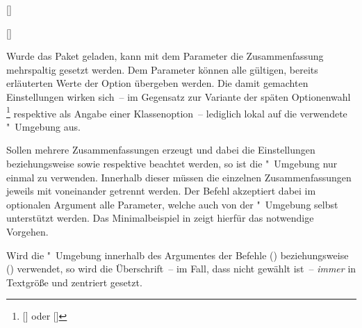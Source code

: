 \begin{Declaration*}{}
\begin{Declaration*}{}
\begin{Declaration*}{}
\begin{Declaration}{[]}
\begin{Declaration}{[]}
\begin{Declaration}{}
\begin{Declaration}[v2.02]{}
\begin{Declaration}[v2.02]{%
}
\begin{Declaration}{}
\begin{Declaration}{}
Wurde das Paket  geladen, kann mit dem Parameter 
 die Zusammenfassung 
mehrspaltig gesetzt werden. Dem Parameter  
können alle gültigen, bereits erläuterten Werte der Option  
übergeben werden. Die damit gemachten Einstellungen wirken sich~-- im Gegensatz 
zur Variante der späten Optionenwahl%
\footnote{%
  [] oder
  []%
}
respektive als Angabe einer Klassenoption~-- lediglich lokal auf die verwendete 
"~Umgebung aus.

Sollen mehrere Zusammenfassungen erzeugt und dabei die Einstellungen 
 beziehungsweise  sowie 
 respektive  beachtet werden, so 
ist die "~Umgebung nur einmal zu verwenden. Innerhalb 
dieser müssen die einzelnen Zusammenfassungen jeweils mit  
voneinander getrennt werden. Der Befehl akzeptiert dabei im optionalen Argument 
alle Parameter, welche auch von der "~Umgebung selbst 
unterstützt werden. Das Minimalbeispiel in  
zeigt hierfür das notwendige Vorgehen.

Wird die "~Umgebung innerhalb des Argumentes der Befehle 
() beziehungsweise 
() verwendet, so wird die 
Überschrift~-- im Fall, dass nicht  gewählt ist~-- 
\emph{immer} in Textgröße und zentriert gesetzt.
\end{Declaration}
\end{Declaration}
\end{Declaration}
\end{Declaration}
\end{Declaration}
\end{Declaration}
\end{Declaration}


\end{Declaration*}
\end{Declaration*}
\end{Declaration*}
